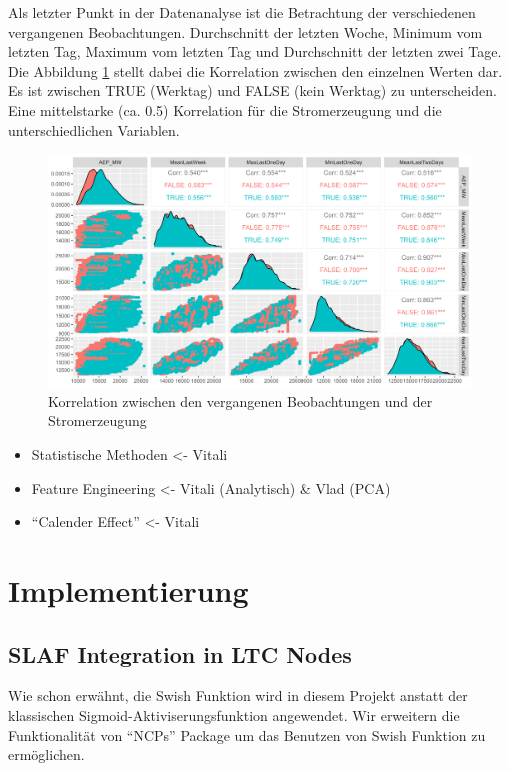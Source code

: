 \documentclass[11pt,ngerman,a4paper,]{article}
\providecommand{\tightlist}{%
  \setlength{\itemsep}{0pt}\setlength{\parskip}{0pt}}
\begin{document}
Als letzter Punkt in der Datenanalyse ist die Betrachtung der verschiedenen vergangenen Beobachtungen. Durchschnitt der letzten Woche, Minimum vom letzten Tag, Maximum vom letzten Tag und Durchschnitt der letzten zwei Tage. Die Abbildung \ref{fig:corr} stellt dabei die Korrelation zwischen den einzelnen Werten dar. Es ist zwischen TRUE (Werktag) und FALSE (kein Werktag) zu unterscheiden. Eine mittelstarke (ca. 0.5) Korrelation für die Stromerzeugung und die unterschiedlichen Variablen.

\begin{figure}[H]
\centering
\includegraphics[width=1.0\textwidth]{plots/corr.png}
\caption{Korrelation zwischen den vergangenen Beobachtungen und der Stromerzeugung}
\label{fig:corr}
\end{figure}

\begin{itemize}
\tightlist
\item
  Statistische Methoden \textless- Vitali
\item
  Feature Engineering \textless- Vitali (Analytisch) \& Vlad (PCA)
\item
  ``Calender Effect'' \textless- Vitali
\end{itemize}

\section{Implementierung}\label{implementierung}

\subsection{SLAF Integration in LTC Nodes}\label{slaf-integration-in-ltc-nodes}

Wie schon erwähnt, die Swish Funktion wird in diesem Projekt anstatt der klassischen Sigmoid-Aktiviserungsfunktion angewendet. Wir erweitern die Funktionalität von ``NCPs'' Package um das Benutzen von Swish Funktion zu ermöglichen.
\end{document}
